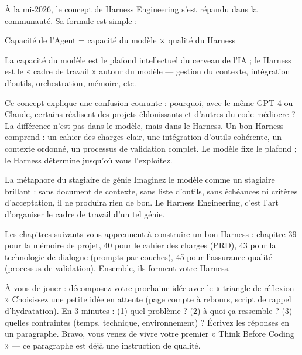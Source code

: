 À la mi-2026, le concept de Harness Engineering s'est répandu dans la communauté. Sa formule est simple :

Capacité de l'Agent = capacité du modèle × qualité du Harness

La capacité du modèle est le plafond intellectuel du cerveau de l'IA ; le Harness est le « cadre de travail » autour du modèle — gestion du contexte, intégration d'outils, orchestration, mémoire, etc.

Ce concept explique une confusion courante : pourquoi, avec le même GPT-4 ou Claude, certains réalisent des projets éblouissants et d'autres du code médiocre ? La différence n'est pas dans le modèle, mais dans le Harness. Un bon Harness comprend : un cahier des charges clair, une intégration d'outils cohérente, un contexte ordonné, un processus de validation complet. Le modèle fixe le plafond ; le Harness détermine jusqu'où vous l'exploitez.

\begin{tcbinfo}{La métaphore du stagiaire de génie}
Imaginez le modèle comme un stagiaire brillant : sans document de contexte, sans liste d'outils, sans échéances ni critères d'acceptation, il ne produira rien de bon. Le Harness Engineering, c'est l'art d'organiser le cadre de travail d'un tel génie.

\end{tcbinfo}

Les chapitres suivants vous apprennent à construire un bon Harness : chapitre 39 pour la mémoire de projet, 40 pour le cahier des charges (PRD), 43 pour la technologie de dialogue (prompts par couches), 45 pour l'assurance qualité (processus de validation). Ensemble, ils forment votre Harness.

\begin{tcbpractice}{À vous de jouer : décomposez votre prochaine idée avec le « triangle de réflexion »}
Choisissez une petite idée en attente (page compte à rebours, script de rappel d'hydratation). En 3 minutes : (1) quel problème ? (2) à quoi ça ressemble ? (3) quelles contraintes (temps, technique, environnement) ? Écrivez les réponses en un paragraphe. Bravo, vous venez de vivre votre premier « Think Before Coding » — ce paragraphe est déjà une instruction de qualité.

\end{tcbpractice}


